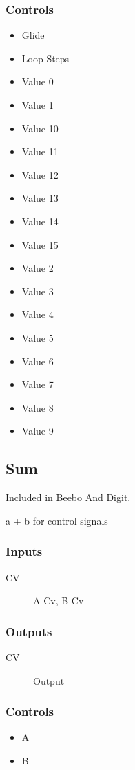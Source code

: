 \subsubsection{Controls}
\begin{itemize}
\item Glide
\item Loop Steps
\item Value 0
\item Value 1
\item Value 10
\item Value 11
\item Value 12
\item Value 13
\item Value 14
\item Value 15
\item Value 2
\item Value 3
\item Value 4
\item Value 5
\item Value 6
\item Value 7
\item Value 8
\item Value 9
\end{itemize}

\subsection{Sum}

Included in Beebo And Digit.

a + b for control signals



\subsubsection{Inputs}
\begin{description}
\item [CV] A Cv, B Cv
\end{description}

\subsubsection{Outputs}
\begin{description}
\item [CV] Output
\end{description}

\subsubsection{Controls}
\begin{itemize}
\item A
\item B
\end{itemize}

